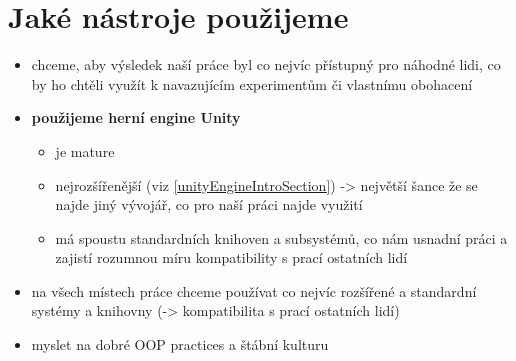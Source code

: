 \section{Jaké nástroje použijeme}

\begin{itemize}
    \item chceme, aby výsledek naší práce byl co nejvíc přístupný pro náhodné lidi, co by ho chtěli využít k navazujícím experimentům či vlastnímu obohacení
    \item \textbf{použijeme herní engine Unity}
        \begin{itemize}
            \item je mature
            \item nejrozšířenější (viz \ref{unityEngineIntroSection}) -> největší šance že se najde jiný vývojář, co pro naší práci najde využití
            \item má spoustu standardních knihoven a subsystémů, co nám usnadní práci a zajistí rozumnou míru kompatibility s prací ostatních lidí
        \end{itemize}
    \item na všech místech práce chceme používat co nejvíc rozšířené a standardní systémy a knihovny (-> kompatibilita s prací ostatních lidí)
    \item myslet na dobré OOP practices a štábní kulturu
\end{itemize}

